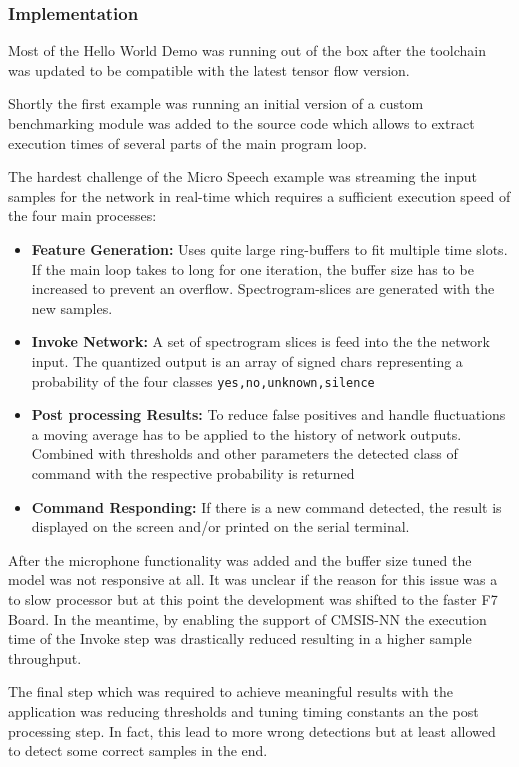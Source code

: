 \documentclass{tum-presentation}
\begin{document}
\begin{frame}
  \frametitle{Implementation}


Most of the Hello World Demo was running out of the box after the toolchain was updated to be compatible with the latest tensor flow version.

Shortly the first example was running an initial version of a custom benchmarking module was added to the source code which allows to extract execution times of several parts of the main program loop.


The hardest challenge of the Micro Speech example was streaming the input samples for the network in real-time which requires a sufficient execution speed of the four main processes:

\begin{itemize}
    \item \textbf{Feature Generation:} Uses quite large ring-buffers to fit multiple time slots. If the main loop takes to long for one iteration, the buffer size has to be increased to prevent an overflow. Spectrogram-slices are generated with the new samples.
    \item \textbf{Invoke Network:} A set of spectrogram slices is feed into the the network input. The quantized output is an array of signed chars representing a probability of the four classes \lstinline{yes,no,unknown,silence}
    \item \textbf{Post processing Results:} To reduce false positives and handle fluctuations a moving average has to be applied to the history of network outputs. Combined with thresholds and other parameters the detected class of command with the respective probability is returned 
    \item \textbf{Command Responding:} If there is a new command detected, the result is displayed on the screen and/or printed on the serial terminal. 
\end{itemize}

After the microphone functionality was added and the buffer size tuned the model was not responsive at all. It was unclear if the reason for this issue was a to slow processor but at this point the development was shifted to the faster F7 Board. In the meantime, by enabling the support of CMSIS-NN the execution time of the Invoke step was drastically reduced resulting in a higher sample throughput. 

The final step which was required to achieve meaningful results with the application was reducing thresholds and tuning timing constants an the post processing step. In fact, this lead to more wrong detections but at least allowed to detect some correct samples in the end.


\end{frame}
\end{document}
